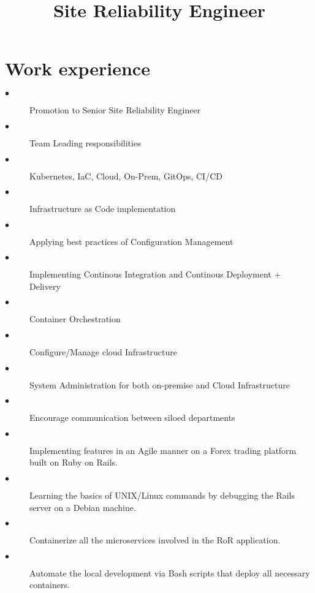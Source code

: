 \documentclass[11pt,a4paper,Hack,english]{moderncv}        %
\title{Site Reliability Engineer}%
\begin{document}
\makecvtitle
\section{Work experience}
{
	\begin{description}
		\item[$\bullet$] Promotion to Senior Site Reliability Engineer
		\item[$\bullet$] Team Leading responsibilities
	\end{description}
}

{
	\begin{description}
		\item[$\bullet$] Kubernetes, IaC, Cloud, On-Prem, GitOps, CI/CD 
	\end{description}
}

{
	\begin{description}
		\item[$\bullet$] Infrastructure as Code implementation
		\item[$\bullet$] Applying best practices of Configuration Management
		\item[$\bullet$] Implementing Continous Integration and Continous Deployment + Delivery
		\item[$\bullet$] Container Orchestration
		\item[$\bullet$] Configure/Manage cloud Infrastructure
		\item[$\bullet$] System Administration for both on-premise and Cloud Infrastructure
		\item[$\bullet$] Encourage communication between siloed departments
	\end{description}
}
{
	\begin{description}
		\item[$\bullet$] Implementing features in an Agile manner on a Forex trading platform built on Ruby on Rails.
		\item[$\bullet$] Learning the basics of UNIX/Linux commands by debugging the Rails server on a Debian machine.
		\item[$\bullet$] Containerize all the microservices involved in the RoR application.
		\item[$\bullet$] Automate the local development via Bash scripts that deploy all necessary containers.
	\end{description}
}
\end{document}
